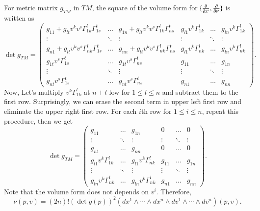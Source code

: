 \documentclass[a4paper, 12pt]{article}
\theoremstyle{Mydefinition}
\theoremstyle{Mytheorem}
\begin{document}
\begin{enumerate}
    For metric matrix $g_{TM}$ in $TM$, the square of the volume form for $\{\pdv{x^i}, \pdv{v^i}\}$ is written as
    \begin{equation}
    \det g_{TM} = \begin{pmatrix}
        g_{11} + g_{lt} v^kv^s\Gamma_{1k}^l\Gamma_{1s}^t & \hdots & g_{1n} + g_{lt} v^kv^s\Gamma_{1k}^l\Gamma_{ns}^t & g_{l1}v^k\Gamma_{1k}^l & \hdots & g_{ln}v^k\Gamma_{1k}^l \\
        \vdots & \ddots & \vdots & \vdots & \ddots & \vdots \\
        g_{n1} + g_{lt} v^kv^s\Gamma_{nk}^l\Gamma_{1s}^t & \hdots & g_{nn} + g_{lt} v^kv^s\Gamma_{nk}^l\Gamma_{ns}^t & g_{l1}v^k\Gamma_{nk}^l & \hdots & g_{ln}v^k\Gamma_{nk}^l \\
        g_{1t}v^s\Gamma_{1s}^t & \hdots & g_{1t}v^s\Gamma_{ns}^t & g_{11} & \hdots & g_{1n} \\
        \vdots & \ddots & \vdots & \vdots & \ddots & \vdots \\
        g_{nt}v^s\Gamma_{1s}^t & \hdots & g_{nt}v^s\Gamma_{ns}^t & g_{n1} & \hdots & g_{nn}
    \end{pmatrix}.
    \end{equation}
     Now, Let's multiply $v^k\Gamma_{1k}^l$ at $n+l$ low for $1\leq l\leq n$ and subtract them to the first row. Surprisingly, we can erase the second term in upper left first row and eliminate the upper right first row. For each $i$th row for $1\leq i\leq n$, repeat this procedure, then we get
    \begin{equation}\label{Eq:Volume_TM}
    \det g_{TM} = \begin{pmatrix}
        g_{11} & \hdots & g_{1n} & 0 & \hdots & 0 \\
        \vdots & \ddots & \vdots & \vdots & \ddots & \vdots \\
        g_{n1} & \hdots & g_{nn} & 0 & \hdots & 0 \\
        g_{l1}v^k\Gamma_{1k}^l & \hdots & g_{l1}v^k\Gamma_{nk}^l & g_{11} & \hdots & g_{1n} \\
        \vdots & \ddots & \vdots & \vdots & \ddots & \vdots \\
        g_{ln}v^k\Gamma_{nk}^l & \hdots & g_{ln}v^k\Gamma_{nk}^l & g_{n1} & \hdots & g_{nn}
    \end{pmatrix}.
    \end{equation}
    Note that the volume form does not depends on $v^i$. Therefore,
    \begin{equation}
        \nu(p,v) = (2n)!\left(\det g(p)\right)^2 \left(dx^1\wedge \cdots \wedge dx^n\wedge dv^1 \wedge \cdots \wedge dv^n\right)(p,v).

\end{equation}
\end{enumerate}
\end{document}
